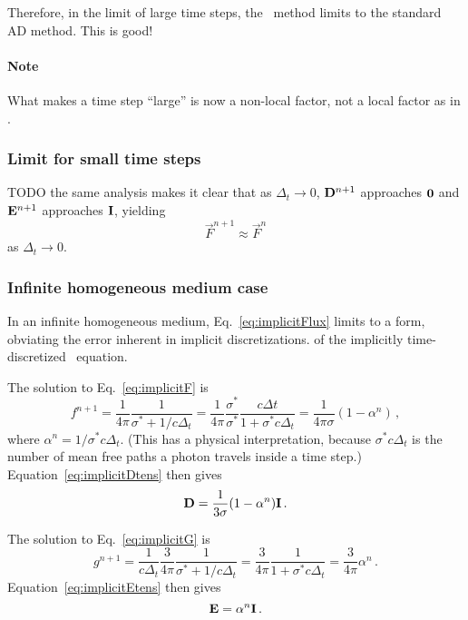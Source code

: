 Therefore, in the limit of large time steps, the \APone\ method limits to the
standard AD method. This is good!

\paragraph{Note} What makes a time step ``large'' is now a non-local factor,
not a local factor as in \Pone.

\subsubsection{Limit for small time steps}
TODO the same analysis makes it clear that as $\Delta_t \to 0$,
$\mathbf{D}^{n+1}$ approaches $\mathbf{0}$ and $\mathbf{E}^{n+1}$ approaches $\mathbf{I}$,
yielding
\begin{equation*}
  \vec{F}^{n+1} \approx \vec{F}^{n}
\end{equation*}
as $\Delta_t \to 0$.

\subsubsection{Infinite homogeneous medium case}
In an infinite homogeneous medium, Eq.~\eqref{eq:implicitFlux} limits to a
form, obviating the error inherent in implicit discretizations.
of the implicitly time-discretized \Pone\ equation.

The solution to Eq.~\eqref{eq:implicitF} is
\begin{equation*}
  f^{n+1}
  = \frac{1}{4\pi} \frac{1}{\sigma^\ast + 1 /c \Delta_t}
  = \frac{1}{4\pi} \frac{\sigma^\ast}{\sigma^\ast} \frac{c \Delta t}{1 + \sigma^\ast c \Delta_t}
  = \frac{1}{4\pi \sigma} ( 1 - \alpha^n) \,,
\end{equation*}
where $\alpha^n = 1/ \sigma^\ast c \Delta_t$. (This has a physical
interpretation, because $\sigma^\ast c \Delta_t$ is the number of mean free
paths a photon travels inside a time step.) Equation~\eqref{eq:implicitDtens}
then gives
\begin{equation*}
  \mathbf{D} = \frac{1}{3 \sigma} ( 1 - \alpha^n) \mathbf{I}\,.
\end{equation*}

The solution to Eq.~\eqref{eq:implicitG} is
\begin{equation*}
  g^{n+1}
  = \frac{1}{c \Delta_t} \frac{3}{4\pi} \frac{1}{\sigma^\ast + 1 /c \Delta_t}
  = \frac{3}{4\pi} \frac{1}{1 + \sigma^\ast c \Delta_t}
  = \frac{3}{4\pi} \alpha^n \,.
\end{equation*}
Equation~\eqref{eq:implicitEtens} then gives
\begin{equation*}
  \mathbf{E} = \alpha^n \mathbf{I}\,.
\end{equation*}

